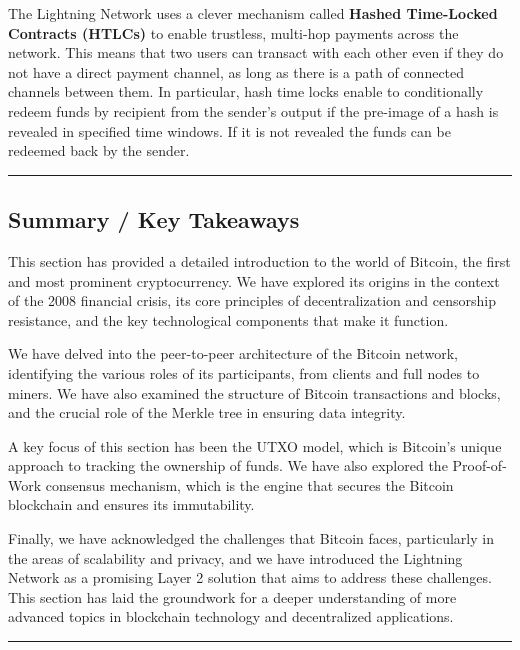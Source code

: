 The Lightning Network uses a clever mechanism called \textbf{Hashed
	Time-Locked Contracts (HTLCs)} to enable trustless, multi-hop payments
across the network. This means that two users can transact with each
other even if they do not have a direct payment channel, as long as
there is a path of connected channels between them. In particular, hash time locks enable to conditionally redeem funds by recipient from the sender's output if the pre-image of a hash is revealed in specified time windows. If it is not revealed the funds can be redeemed back by the sender.

\begin{center}\rule{0.5\linewidth}{0.5pt}\end{center}

\subsection{Summary / Key Takeaways}\label{summary-key-takeaways}

This section has provided a detailed introduction to the world of
Bitcoin, the first and most prominent cryptocurrency. We have explored
its origins in the context of the 2008 financial crisis, its core
principles of decentralization and censorship resistance, and the key
technological components that make it function.

We have delved into the peer-to-peer architecture of the Bitcoin
network, identifying the various roles of its participants, from clients
and full nodes to miners. We have also examined the structure of Bitcoin
transactions and blocks, and the crucial role of the Merkle tree in
ensuring data integrity.

A key focus of this section has been the UTXO model, which is Bitcoin's
unique approach to tracking the ownership of funds. We have also
explored the Proof-of-Work consensus mechanism, which is the engine that
secures the Bitcoin blockchain and ensures its immutability.

Finally, we have acknowledged the challenges that Bitcoin faces,
particularly in the areas of scalability and privacy, and we have
introduced the Lightning Network as a promising Layer 2 solution that
aims to address these challenges. This section has laid the groundwork
for a deeper understanding of more advanced topics in blockchain
technology and decentralized applications.

\begin{center}\rule{0.5\linewidth}{0.5pt}\end{center}

